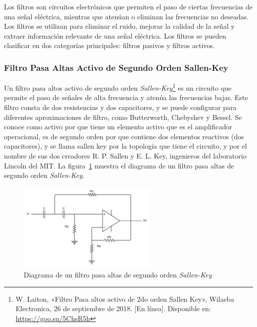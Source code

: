         Los filtros son circuitos electrónicos que permiten el paso de ciertas frecuencias de una señal eléctrica, mientras que atenúan o eliminan las frecuencias no deseadas. Los filtros se utilizan para eliminar el ruido, mejorar la calidad de la señal y extraer información relevante de una señal eléctrica. Los filtros se pueden clasificar en dos categorías principales: filtros pasivos y filtros activos.

        \subsubsection{Filtro Pasa Altas Activo de Segundo Orden Sallen-Key}

            Un filtro pasa altos activo de segundo orden \textit{Sallen-Key}\footnote{W. Laiton, «Filtro Pasa altos activo de 2do orden Sallen Key», Wilaeba Electronica, 26 de septiembre de 2018. [En línea]. Disponible en: \url{https://goo.su/5ChsR5h}} es un circuito que permite el paso de señales de alta frecuencia y atenúa las frecuencias bajas. Este filtro consta de dos resistencias y dos capacitores, y se puede configurar para diferentes aproximaciones de filtro, como Butterworth, Chebyshev y Bessel. Se conoce como activo por que tiene un elemento activo que es el amplificador operacional, es de segundo orden por que contiene dos elementos reactivos (dos capacitores), y se llama sallen key por la topología que tiene el circuito, y por el nombre de sus dos creadores R. P. Sallen y E. L. Key, ingenieros del laboratorio Lincoln del MIT. La figura~\ref{fig:Filtro_Pasa_Altas} muestra el diagrama de un filtro pasa altas de segundo orden \textit{Sallen-Key}.

            \begin{figure}[H]
                \centering
                \includegraphics[width=0.6\textwidth]{img/Desarrollo/Filtro_Pasa_Altas.png}
                \caption[Diagrama de un filtro pasa altas de segundo orden \textit{Sallen-Key}.]{Diagrama de un filtro pasa altas de segundo orden \textit{Sallen-Key}}
                \label{fig:Filtro_Pasa_Altas}
            \end{figure}

